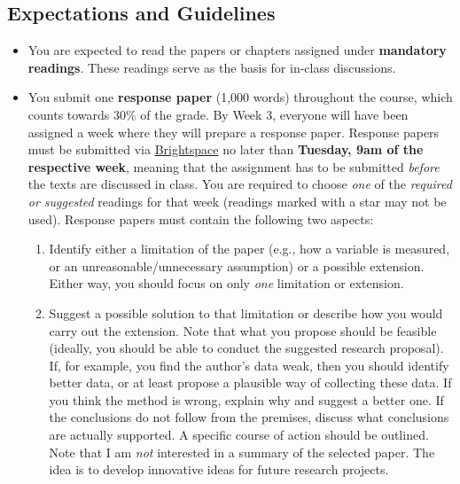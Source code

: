 \documentclass[abstract=on,parskip=full,headings=standardclasses,fontsize=11pt,paper=a4]{scrartcl}
\begin{document}
\subsection*{Expectations and Guidelines}
\begin{itemize}


\item You are expected to read the papers or chapters assigned under \textbf{mandatory readings}. These readings serve as the basis for in-class discussions.%

\item You submit one \textbf{response paper} (1,000 words) throughout the course, which counts towards 30\% of the grade. By Week 3, everyone will have been assigned a week where they will prepare a response paper. Response papers must be submitted via \href{https://brightspace.ucd.ie/}{Brightspace} no later than \textbf{Tuesday, 9am of the respective week}, meaning that the assignment has to be submitted \textit{before} the texts are discussed in class. You are required to choose \textit{one} of the \textit{required or suggested} readings for that week (readings marked with a star may not be used).  Response papers must contain the following two aspects:
\begin{enumerate}
\item Identify either a limitation of the paper (e.g., how a variable is measured, or an unreasonable/unnecessary assumption) or a possible extension. Either way, you should focus on only \textit{one} limitation or extension.
\item Suggest a possible solution to that limitation or describe how you would carry out the extension. Note that what you propose should be feasible (ideally, you should be able to conduct the suggested research proposal). If, for example, you find the author's data weak, then you should identify better data, or at least propose a plausible way of collecting these data. If you think the method is wrong, explain why and suggest a better one. If the conclusions do not follow from the premises, discuss what conclusions are actually supported. A specific course of action should be outlined. Note that I am \textit{not} interested in a summary of the selected paper. The idea is to develop innovative ideas for future research projects. 
\end{enumerate}


\end{itemize}
\end{document}
